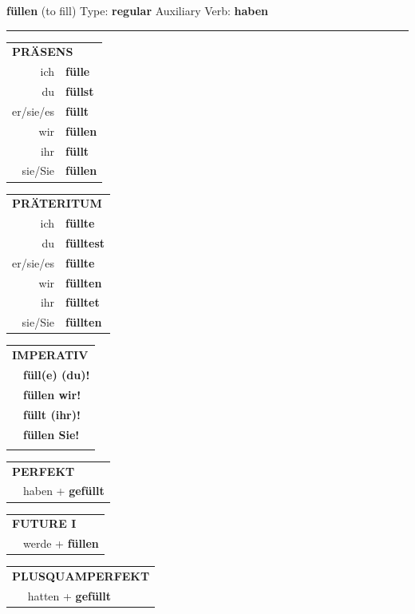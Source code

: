 \documentclass[10pt,a4paper]{revtex4-2}
\begin{document}
\begin{verbbox}
    {\Large \bf füllen} (to fill) \hfill Type: \textbf{regular} \hfill Auxiliary Verb: \textbf{haben} 
    
     \vspace{5pt}

    \hrule
    
    \vspace{5pt}

  \begin{tabular}{rl}
     \multicolumn{2}{l}{\textbf{PRÄSENS} }\\
    ich & \textbf{fülle}\\
    du & \textbf{füllst}\\
    er/sie/es & \textbf{füllt}\\
    wir & \textbf{füllen}\\
    ihr & \textbf{füllt}\\
    sie/Sie & \textbf{füllen}\\
  \end{tabular}
  \hfill
     \begin{tabular}{rl}
    \multicolumn{2}{l}{\textbf{PRÄTERITUM} }\\
    ich & \textbf{füllte}\\
    du & \textbf{fülltest}\\
    er/sie/es & \textbf{füllte}\\
    wir & \textbf{füllten}\\
    ihr & \textbf{fülltet}\\
    sie/Sie & \textbf{füllten}\\
  \end{tabular}
  \hfill
  \begin{tabular}{rl}
     \multicolumn{2}{l}{\textbf{IMPERATIV} }\\
   & \textbf{füll(e) (du)!}\\
   & \textbf{füllen wir!}\\
   & \textbf{füllt (ihr)!}\\
   & \textbf{füllen Sie!}\\
   & \vspace{10pt}
  \end{tabular}

    \vspace{10pt}

 \begin{tabular}{rl}
     \multicolumn{2}{l}{\textbf{PERFEKT}}\\
   & haben + \textbf{gefüllt}\\
  \end{tabular}
\hfill
   \begin{tabular}{rl}
    \multicolumn{2}{l}{\textbf{FUTURE I} }\\
   & werde + \textbf{füllen}\\
  \end{tabular}
\hfill
   \begin{tabular}{rl}
      \multicolumn{2}{l}{\textbf{PLUSQUAMPERFEKT}}\\
   & hatten + \textbf{gefüllt}\\
  \end{tabular}


\end{verbbox}
\end{document}
